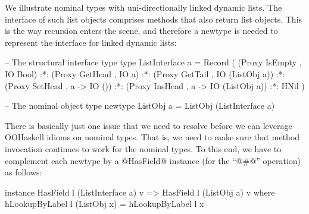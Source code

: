 \documentclass{jfp}
\begin{document}

We illustrate nominal types with uni-directionally linked dynamic
lists. The interface of such list objects comprises methods that also
return list objects. This is the way recursion enters the scene, and
therefore a newtype is needed to represent the interface for linked
dynamic lists:

\begin{code}
 -- The structural interface type
 type ListInterface a =
      Record (     (Proxy IsEmpty  , IO Bool)
               :*: (Proxy GetHead  , IO a)
               :*: (Proxy GetTail  , IO (ListObj a))
               :*: (Proxy SetHead  , a -> IO ())
               :*: (Proxy InsHead  , a -> IO (ListObj a))
               :*: HNil )
\end{code}

\begin{code}
 -- The nominal object type
 newtype ListObj a =
         ListObj (ListInterface a)
\end{code}

There is basically just one issue that we need to resolve before we
can leverage OOHaskell idioms on nominal types. That is, we need to
make sure that method invocation continues to work for the nominal
types. To this end, we have to complement each newtype by a @HasField@
instance (for the ``@#@'' operation) as follows:

\begin{code}
 instance HasField l (ListInterface a) v =>
          HasField l (ListObj a) v
   where
   hLookupByLabel l (ListObj x) = hLookupByLabel l x
\end{code}
\end{document}
